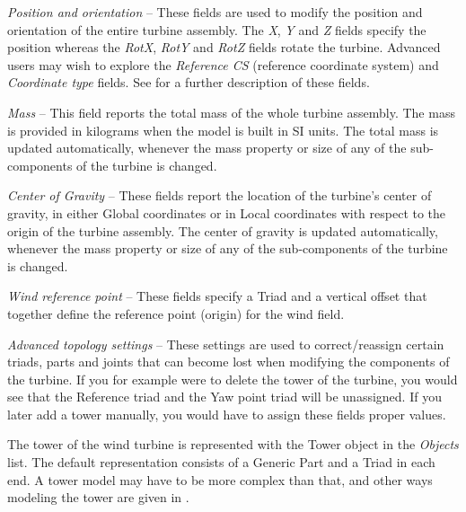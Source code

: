\begin{bulletlist}
\item{\sl Position and orientation} --
  These fields are used to modify the position and orientation of the entire
  turbine assembly. The {\sl X}, {\sl Y} and {\sl Z} fields specify the position
  whereas the {\sl RotX}, {\sl RotY} and {\sl RotZ} fields rotate the turbine.
  Advanced users may wish to explore the {\sl Reference CS}
  (reference coordinate system) and {\sl Coordinate type} fields.
  See 
  for a further description of these fields.
\item{\sl Mass} --
  This field reports the total mass of the whole turbine assembly.
  The mass is provided in kilograms when the model is built in SI units.
  The total mass is updated automatically, whenever the mass property or
  size of any of the sub-components of the turbine is changed.
\item{\sl Center of Gravity} --
  These fields report the location of the turbine's center of gravity,
  in either Global coordinates or in Local coordinates with respect to
  the origin of the turbine assembly. The center of gravity is updated
  automatically, whenever the mass property or size of any of the
  sub-components of the turbine is changed.
\item{\sl Wind reference point} --
  These fields specify a Triad and a vertical offset that together
  define the reference point (origin) for the wind field.
\item{\sl Advanced topology settings} --
  These settings are used to correct/reassign certain triads, parts and joints
  that can become lost when modifying the components of the turbine.
  If you for example were to delete the tower of the turbine,
  you would see that the Reference triad and the Yaw point triad will be
  unassigned. If you later add a tower manually,
  you would have to assign these fields proper values.
\end{bulletlist}


The tower of the wind turbine is represented with the Tower object in
the {\sl Objects} list. The default representation consists of a Generic Part
and a Triad in each end. A tower model may have to be more complex than that,
and other ways modeling the tower are given in
.


